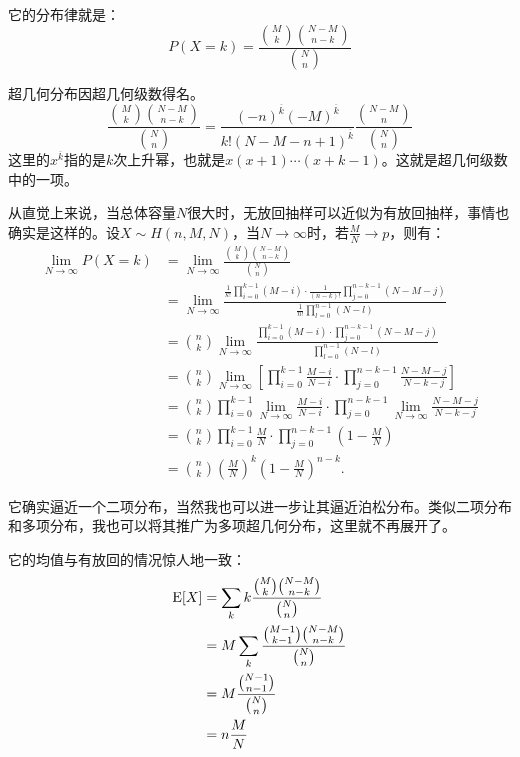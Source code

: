 它的分布律就是：
\[
P(X=k)=\frac{\binom{M}{k}\binom{N-M}{n-k}}{\binom{N}{n}}
\]

超几何分布因超几何级数得名。
\[
\frac{\binom{M}{k}\binom{N-M}{n-k}}{\binom{N}{n}}=\frac{(-n)^{\overline{k}}(-M)^{\overline{k}}}{k!(N-M-n+1)^{\overline{k}}} \frac{\binom{N-M}{n}}{\binom{N}{n}}
\]
这里的$x^{\overline{k}}$指的是$k$次上升幂，也就是$x(x+1)\cdots(x+k-1)$。这就是超几何级数中的一项。

从直觉上来说，当总体容量$N$很大时，无放回抽样可以近似为有放回抽样，事情也确实是这样的。设$X\sim H(n,M,N)$，当$N\to\infty$时，若$\frac MN \to p$，则有：
\begin{align*}
\lim_{N \to \infty} P(X = k) 
&= \lim_{N \to \infty} \frac{\binom{M}{k} \binom{N-M}{n-k}}{\binom{N}{n}} \\
&= \lim_{N \to \infty} \frac{ \frac{1}{k!}\prod_{i=0}^{k-1}(M-i) \cdot \frac{1}{(n-k)!}\prod_{j=0}^{n-k-1}(N-M-j) }{ \frac{1}{n!} \prod_{l=0}^{n-1}(N-l)} \\
&= \binom{n}{k} \lim_{N \to \infty} \frac{ \prod_{i=0}^{k-1}(M-i) \cdot \prod_{j=0}^{n-k-1}(N-M-j) }{ \prod_{l=0}^{n-1}(N-l) } \\
&= \binom{n}{k} \lim_{N \to \infty} \left[ \prod_{i=0}^{k-1} \frac{M-i}{N-i} \cdot \prod_{j=0}^{n-k-1} \frac{N-M-j}{N-k-j} \right] \\
&= \binom{n}{k} \prod_{i=0}^{k-1} \lim_{N \to \infty} \frac{M-i}{N-i} \cdot \prod_{j=0}^{n-k-1} \lim_{N \to \infty} \frac{N-M-j}{N-k-j} \\
&= \binom{n}{k} \prod_{i=0}^{k-1} \frac{M}{N} \cdot \prod_{j=0}^{n-k-1} \left(1 - \frac{M}{N}\right) \\
&= \binom{n}{k} \left(\frac{M}{N}\right)^k \left(1 - \frac{M}{N}\right)^{n-k}.
\end{align*}

它确实逼近一个二项分布，当然我也可以进一步让其逼近泊松分布。类似二项分布和多项分布，我也可以将其推广为多项超几何分布，这里就不再展开了。

它的均值与有放回的情况惊人地一致：
\begin{align*}
\operatorname{E}[X]&=\sum_{k}k\frac{\binom{M}{k}\binom{N-M}{n-k}}{\binom{N}{n}}\\
&=M\sum_{k}\frac{\binom{M-1}{k-1}\binom{N-M}{n-k}}{\binom{N}{n}}\\
&=M\frac{\binom{N-1}{n-1}}{\binom{N}{n}}\\
&=n\frac{M}{N}
\end{align*}


